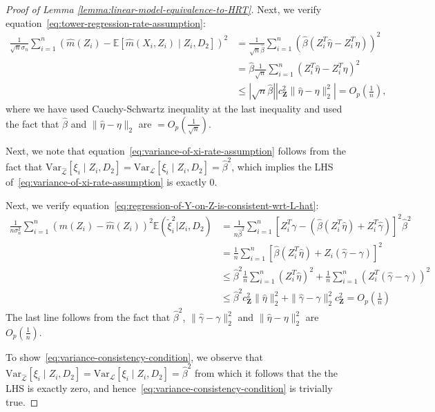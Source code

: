 \documentclass[12pt]{article}
\theoremstyle{definition}
\theoremstyle{remark}
\newcommand{\E}{\mathbb E}								%
\newcommand{\V}{\mathrm{Var}}							%
\newcommand{\srx}{X}									%
\newcommand{\prz}{\bm Z}								%
\newcommand{\srz}{Z}									%
\newcommand{\sxi}{\xi}							%
\newcommand{\law}{\mathcal L}							%
\newcommand{\lawhat}{\widehat{\mathcal L}}				%
\begin{document}
\begin{proof}[Proof of Lemma \ref{lemma:linear-model-equivalence-to-HRT}]
Next, we verify equation~\eqref{eq:tower-regression-rate-assumption}:
\begin{align*}
		\frac{1}{\sqrt n\sigma_n}\sum_{i=1}^n (\widehat m(\srz_i) - \E\left[\widehat m(\srx_i,\srz_i) \mid \srz_i, D_2\right])^2 &= \frac{1}{\sqrt n \widehat \beta} \sum_{i=1}^n \left(\widehat{\beta}(\srz_i^T\widehat \eta - \srz_i^T \eta)\right)^2\\
		&= \widehat{\beta} \frac{1}{\sqrt n} \sum_{i=1}^n \left(\srz_i^T\widehat \eta - \srz_i^T \eta\right)^2\\
		&\leq |\sqrt n \widehat{\beta} | |c_{\prz}^2 \|\widehat{\eta} -\eta\|_2^2|  =O_p\left(\frac{1}{n}\right),
\end{align*}
where we have used Cauchy-Schwartz inequality at the last inequality and used the fact that $\widehat{\beta} $ and $\|\widehat{\eta}-\eta\|_2 $ are $=O_p\left(\frac{1}{\sqrt n}\right)$.

Next, we note that equation~\eqref{eq:variance-of-xi-rate-assumption} follows from the fact that $\V_{\lawhat}[\sxi_i \mid \srz_i, D_2] = \V_{\law}[\sxi_i \mid \srz_i, D_2] = \widehat \beta^2$, which implies the LHS of~\eqref{eq:variance-of-xi-rate-assumption} is exactly $0$.

Next, we verify equation~\eqref{eq:regression-of-Y-on-Z-is-consistent-wrt-L-hat}:
  \begin{align*}
  	\frac{1}{n\sigma_n^2} \sum_{i=1}^n (m(\srz_i) - \widehat m(\srz_i))^2 \E(\widetilde \xi_i^2 | \srz_i, D_2) 
  	&= 	\frac{1}{n\widehat \beta^2} \sum_{i=1}^n \left[\srz_i^T\gamma - (\widehat \beta (\srz_i^T \widehat \eta) + \srz_i^T\widehat \gamma)\right]^2\widehat \beta^2 \\
  	&= \frac{1}{n} \sum_{i=1}^n \left[\widehat \beta(\srz_i^T\widehat\eta) + \srz_i (\widehat \gamma -\gamma)\right]^2\\
  	&\leq \widehat \beta^2 \frac{1}{n} \sum_{i=1}^n (\srz_i^T\widehat \eta)^2 + \frac{1}{n} \sum_{i=1}^n (\srz_i^T(\widehat \gamma - \gamma))^2\\
  	&\leq \widehat \beta^2 c_{\prz}^2\|\widehat{\eta}\|_2^2 + \|\widehat{\gamma} -\gamma\|_2^2 c^2_{\prz} =O_p\left(\frac{1}{n}\right)
  \end{align*}
The last line follows from the fact that $\widehat \beta^2$, $ \|\widehat{\gamma} -\gamma\|_2^2$ and $\|\widehat{\eta} -\eta\|_2^2$  are $O_p\left(\frac{1}{n}\right)$.

To show~\eqref{eq:variance-consistency-condition}, we observe that $\V_{\lawhat}[\sxi_i \mid \srz_i, D_2] = \V_{\law}[\sxi_i \mid \srz_i, D_2] = \widehat \beta^2$ from which it follows that the the LHS is exactly zero, and hence~\eqref{eq:variance-consistency-condition} is trivially true.


\end{proof}
\end{document}
